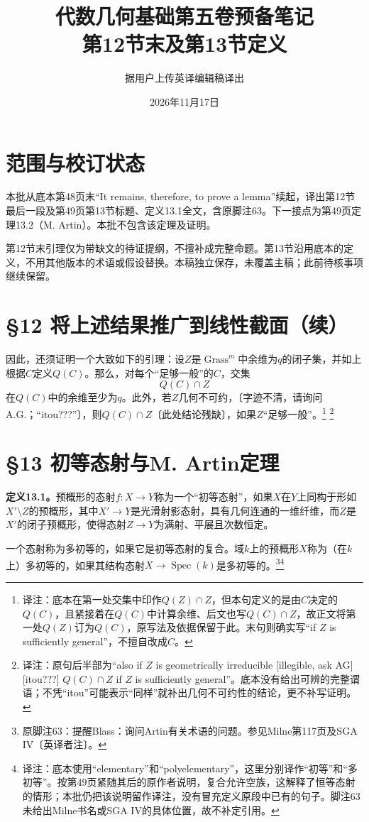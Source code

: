 \documentclass[openany,fontset=fandol]{ctexbook}
\newcommand{\note}[1]{\footnote{译注：#1}}
\begin{document}
\title{代数几何基础第五卷预备笔记\\第12节末及第13节定义}
\author{据用户上传英译编辑稿译出}
\date{2026年11月17日}
\maketitle
\chapter*{范围与校订状态}
本批从底本第48页末“It remains, therefore, to prove a lemma”续起，译出第12节最后一段及第49页第13节标题、定义13.1全文，含原脚注63。下一接点为第49页定理13.2（M. Artin）。本批不包含该定理及证明。

第12节末引理仅为带缺文的待证提纲，不擅补成完整命题。第13节沿用底本的定义，不用其他版本的术语或假设替换。本稿独立保存，未覆盖主稿；此前待核事项继续保留。
\chapter*{§12 将上述结果推广到线性截面（续）}
因此，还须证明一个大致如下的引理：设$Z$是$\operatorname{Grass}^m$中余维为$q$的闭子集，并如上根据$C$定义$Q(C)$。那么，对每个“足够一般”的$C$，交集
\[
Q(C)\cap Z
\]
在$Q(C)$中的余维至少为$q$。此外，若$Z$几何不可约，〔字迹不清，请询问A.G.；“itou???”〕，则$Q(C)\cap Z$〔此处结论残缺〕，如果$Z$“足够一般”。\note{底本在第一处交集中印作$Q(Z)\cap Z$，但本句定义的是由$C$决定的$Q(C)$，且紧接着在$Q(C)$中计算余维、后文也写$Q(C)\cap Z$，故正文将第一处$Q(Z)$订为$Q(C)$，原写法及依据保留于此。末句则确实写“if $Z$ is sufficiently general”，不擅自改成$C$。}
\note{原句后半部为“also if $Z$ is geometrically irreducible [illegible, ask AG] [itou???] $Q(C)\cap Z$ if $Z$ is sufficiently general”。底本没有给出可辨的完整谓语；不凭“itou”可能表示“同样”就补出几何不可约性的结论，更不补写证明。}

\chapter*{§13 初等态射与M. Artin定理}
\textbf{定义13.1。}预概形的态射$f\colon X\to Y$称为一个“初等态射”，如果$X$在$Y$上同构于形如$X'\setminus Z$的预概形，其中$X'\to Y$是光滑射影态射，具有几何连通的一维纤维，而$Z$是$X'$的闭子预概形，使得态射$Z\to Y$为满射、平展且次数恒定。

一个态射称为多初等的，如果它是初等态射的复合。域$k$上的预概形$X$称为（在$k$上）多初等的，如果其结构态射$X\to\operatorname{Spec}(k)$是多初等的。\footnote{原脚注63：提醒Blass：询问Artin有关术语的问题。参见Milne第117页及SGA IV〔英译者注〕。}\note{底本使用“elementary”和“polyelementary”，这里分别译作“初等”和“多初等”。按第49页紧随其后的原作者说明，复合允许空族，这解释了恒等态射的情形；本批仍把该说明留作译注，没有冒充定义原段中已有的句子。脚注63未给出Milne书名或SGA IV的具体位置，故不补定引用。}
\end{document}
